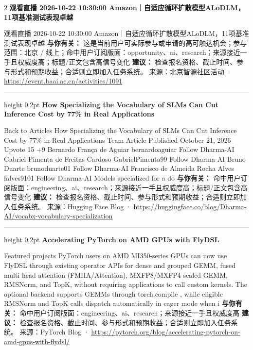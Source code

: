\documentclass[10.5pt]{ctexart}
\begin{document}
\begin{multicols}{2}
{\large\bfseries 观看直播 2026-10-22 10:30:00 Amazon｜自适应循环扩散模型ALoDLM，11项基准测试表现卓越}\par
观看直播 2026-10-22 10:30:00 Amazon｜自适应循环扩散模型ALoDLM，11项基准测试表现卓越
\textbf{与你有关：} 这是当前用户可实际参与或申请的高可触达机会；参与范围：北京 / 线上；命中用户订阅版面：opportunity、ai、research；来源接近一手且权威度高；标题/正文包含高信号变化
\textbf{建议：} 检查报名资格、截止时间、参与形式和预期收益；合适则立即加入任务系统。
{\footnotesize\color{ormuted} 来源：北京智源社区活动 · \url{https://event.baai.ac.cn/activities/1091}}
\vspace{2mm}
\hrule height 0.2pt
\vspace{2mm}
{\large\bfseries How Specializing the Vocabulary of SLMs Can Cut Inference Cost by 77\% in Real Applications}\par
Back to Articles How Specializing the Vocabulary of SLMs Can Cut Inference Cost by 77\% in Real Applications Team Article Published October 21, 2026 Upvote 15 +9 Bernardo França de Aguiar bernardoaguiar Follow Dharma-AI Gabriel Pimenta de Freitas Cardoso GabrielPimenta99 Follow Dharma-AI Bruno Duarte brunoduarte01 Follow Dharma-AI Francisco de Almeida Rocha Alves falves9101 Follow Dharma-AI Models specialized for a do
\textbf{与你有关：} 命中用户订阅版面：engineering、ai、research；来源接近一手且权威度高；标题/正文包含高信号变化
\textbf{建议：} 检查报名资格、截止时间、参与形式和预期收益；合适则立即加入任务系统。
{\footnotesize\color{ormuted} 来源：Hugging Face Blog · \url{https://huggingface.co/blog/Dharma-AI/vocabx-vocabulary-specialization}}
\vspace{2mm}
\hrule height 0.2pt
\vspace{2mm}
{\large\bfseries Accelerating PyTorch on AMD GPUs with FlyDSL}\par
Featured projects PyTorch users on AMD MI350-series GPUs can now use FlyDSL through existing operator APIs for dense and grouped GEMM, fused multi-head attention (FMHA/Attention), MXFP8/MXFP4 scaled GEMM, RMSNorm, and TopK, without requiring applications to call custom kernels. The optional backend supports GEMMs through torch.compile , while eligible RMSNorm and TopK calls dispatch automatically in eager mode when i
\textbf{与你有关：} 命中用户订阅版面：engineering、ai、research；来源接近一手且权威度高
\textbf{建议：} 检查报名资格、截止时间、参与形式和预期收益；合适则立即加入任务系统。
{\footnotesize\color{ormuted} 来源：PyTorch Blog · \url{https://pytorch.org/blog/accelerating-pytorch-on-amd-gpus-with-flydsl/}}

\end{multicols}
\end{document}
